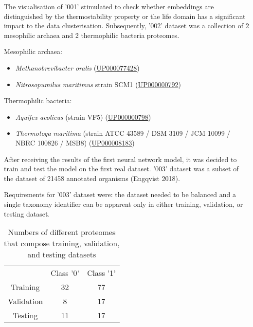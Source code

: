\documentclass[12pt]{report}
\begin{document}
	The visualisation of '001' stimulated to check whether embeddings are 
	distinguished by the thermostability property or the life domain has a
	significant impact to the data clusterisation. Subsequently, '002' dataset 
	was a collection of 2 mesophilic archaea and 2 thermophilic bacteria
	proteomes.

	\vspace*{0.5cm}

	Mesophilic archaea:

	\begin{itemize}
		\item \textit{Methanobrevibacter oralis} 
		(\href{https://www.uniprot.org/proteomes/UP000077428}{UP000077428})
		\item \textit{Nitrosopumilus maritimus} strain SCM1 (\href{https://www.uniprot.org/proteomes/UP000000792}{UP000000792})
	\end{itemize}

	Thermophilic bacteria:

	\begin{itemize}
		\item \textit{Aquifex aeolicus} (strain VF5)
		(\href{https://www.uniprot.org/proteomes/UP000000798}{UP000000798})
		\item \textit{Thermotoga maritima} 
		(strain ATCC 43589 / DSM 3109 / JCM 10099 / NBRC 100826 / MSB8) 
		(\href{https://www.uniprot.org/proteomes/UP000008183}{UP000008183})
	\end{itemize}

	After receiving the results of the first neural network model, it was decided
	to train and test the model on the first real dataset. '003' dataset was a subset
	of the dataset of 21458 annotated organisms (Engqvist 2018). 
	
	Requirements for '003' dataset were: the dataset needed to be balanced and a
	single taxonomy identifier can be apparent only in either training, validation,
	or testing dataset.

	\begin{table}[h!]
		\caption{Numbers of different proteomes that compose training, 
		validation, and testing datasets}
		\label{table:1} 
		\vspace{0.2cm}
		\centering
		\begin{tabular}{ c c c }
			 & Class '0' & Class '1' \\
			Training & 32 & 77 \\ 
			Validation & 8 & 17 \\
			Testing & 11 & 17   
		\end{tabular}
	\end{table}
\end{document}
